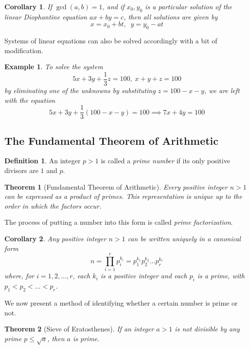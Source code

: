 \documentclass{article}
\newtheorem{theorem}{Theorem}[section]
\newtheorem{example}{Example}[section]
\newtheorem{corollary}{Corollary}[theorem]
\theoremstyle{remark}
\theoremstyle{definition}
\newtheorem{definition}{Definition}[section]
\begin{document}
\begin{corollary}
If $\gcd(a, b) = 1$, and if $x_0, y_0$ is a particular solution of the linear Diophantine equation $ax + by = c$, then all solutions are given by
\[x = x_0 + bt, \;\; y = y_0 - at\]
\end{corollary}

Systems of linear equations can also be solved accordingly with a bit of modification. 

\begin{example}
To solve the system 
\[5x + 3y + \frac{1}{3}z = 100, \; x + y + z = 100\]
by eliminating one of the unknowns by substituting $z = 100 - x - y$, we are left with the equation 
\[5x + 3y + \frac{1}{3} (100-x-y) = 100 \implies 7x + 4y = 100\]
\end{example}

\subsection{The Fundamental Theorem of Arithmetic}

\begin{definition}
An integer $p > 1$ is called a \textit{prime number} if its only positive divisors are $1$ and $p$.
\end{definition}

\begin{theorem}[Fundamental Theorem of Arithmetic]
Every positive integer $n>1$ can be expressed as a product of primes. This representation is unique up to the order in which the factors occur. 
\end{theorem}

The process of putting a number into this form is called \textit{prime factorization}. 

\begin{corollary}
Any positive integer $n>1$ can be written uniquely in a \textit{canonical form}
\[n = \prod_{i=1}^r p_i^{k_i} = p_1^{k_1} p_2^{k_2}... p_r^{k_r}\]
where, for $i=1, 2, ..., r$, each $k_i$ is a positive integer and each $p_i$ is a prime, with $p_1 < p_2 < ... < p_r$. 
\end{corollary}

We now present a method of identifying whether a certain number is prime or not. 

\begin{theorem}[Sieve of Eratosthenes]
If an integer $a >1$ is not divisible by any prime $p \leq \sqrt{a}$, then $a$ is prime. 
\end{theorem}
\end{document}
